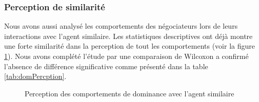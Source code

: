 	\subsubsection{Perception de similarité}
	Nous avons aussi analysé les comportements des négociateurs lors de leurs interactions avec l'agent similaire. Les statistiques descriptives ont déjà montre une forte similarité dans la perception de tout les comportements (voir la figure \ref{fig:sim}). Nous avons complété l'étude par une comparaison de Wilcoxon a confirmé l'absence de différence significative comme présenté dans la table \ref{tab:domPercption}.  
	
	
	\begin{figure}[h]
		\centering
		
		\caption{Perception des comportements de dominance avec l'agent similaire}
		\label{fig:sim}
	\end{figure}
	
